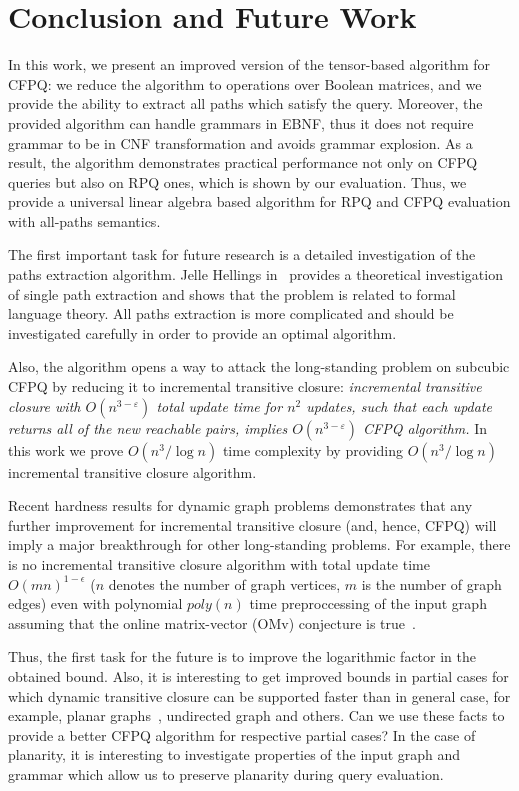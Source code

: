 \section{Conclusion and Future Work}

In this work, we present an improved version of the tensor-based algorithm for CFPQ: we reduce the algorithm to operations over Boolean matrices, and we provide the ability to extract all paths which satisfy the query.
Moreover, the provided algorithm can handle grammars in EBNF, thus it does not require grammar to be in CNF transformation and avoids grammar explosion.
As a result, the algorithm demonstrates practical performance not only on CFPQ queries but also on RPQ ones, which is shown by our evaluation. 
Thus, we provide a universal linear algebra based algorithm for RPQ and CFPQ evaluation with all-paths semantics.

The first important task for future research is a detailed investigation of the paths extraction algorithm.
Jelle Hellings in~\cite{!!!} provides a theoretical investigation of single path extraction and shows that the problem is related to formal language theory.
All paths extraction is more complicated and should be investigated carefully in order to provide an optimal algorithm.

Also, the algorithm opens a way to attack the long-standing problem on subcubic CFPQ by reducing it to incremental transitive closure: \textit{incremental transitive closure with $O(n^{3-\varepsilon})$ total update time for $n^2$ updates, such that each update returns all of the new reachable pairs, implies $O(n^{3-\varepsilon})$ CFPQ algorithm.}
In this work we prove $O(n^3/\log{n})$ time complexity by providing $O(n^3/\log{n})$ incremental transitive closure algorithm. 

Recent hardness results for dynamic graph problems demonstrates that any further improvement for incremental transitive closure (and, hence, CFPQ)  will imply a major breakthrough for other long-standing problems. For example, there is no incremental transitive closure algorithm with total update time $O{(mn)}^{1-\epsilon}$ ($n$ denotes the number of graph vertices, $m$ is the number of graph edges) even with polynomial $poly(n)$ time preproccessing of the input graph assuming that the online matrix-vector (OMv) conjecture is true~\cite{10.1145/2746539.2746609}. 


Thus, the first task for the future is to improve the logarithmic factor in the obtained bound.
Also, it is interesting to get improved bounds in partial cases for which dynamic transitive closure can be supported faster than in general case, for example, planar graphs~\cite{10.1007/3-540-57273-2_72}, undirected graph and others.
Can we use these facts to provide a better CFPQ algorithm for respective partial cases? 
In the case of planarity, it is interesting to investigate properties of the input graph and grammar which allow us to preserve planarity during query evaluation.

